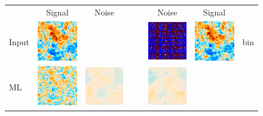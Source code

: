 \documentclass[twocolumn,apj]{aastex63}
\newenvironment{closetabcols}[1][0.5mm]{\setlength{\tabcolsep}{#1}}{}
\begin{document}
\begin{figure}[p]
	\centering
	\hspace*{-10mm}\begin{closetabcols}
		\begin{tabular}{C{13mm}ccm{1mm}|m{1mm}ccC{14mm}}
			& Signal & Noise & & & Noise & Signal & \\
		Input &
		\includegraphics[width=30mm,valign=m]{subpix/toy2d_input_signal_map.png} &
		& & &
		\includegraphics[width=30mm,valign=m]{subpix/toy2d_binned_nn_noise_map.png} &
		\includegraphics[width=30mm,valign=m]{subpix/toy2d_binned_nn_signal_map.png} &
		bin \\[13.6mm]
		ML &
		\includegraphics[width=30mm,valign=m]{subpix/toy2d_ml_nn_signal_map.png} &
		\includegraphics[width=30mm,valign=m]{subpix/toy2d_ml_nn_noise_map.png} & & &
		\includegraphics[width=30mm,valign=m]{subpix/toy2d_destripe_plain_004_nn_noise_map.png} &

\end{tabular}
\end{closetabcols}
\end{figure}
\end{document}
